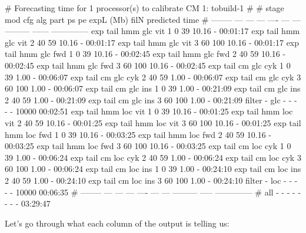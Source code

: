 
\begin{sreoutput}
# Forecasting time for 1 processor(s) to calibrate CM 1: tobuild-1
#
# stage     mod  cfg  alg  part  ps  pe expL (Mb)   filN predicted time
# --------  ---  ---  ---  ---- --- --- --------- ------ --------------
  exp tail  hmm  glc  vit     1   0  39     10.16      -       00:01:17
  exp tail  hmm  glc  vit     2  40  59     10.16      -       00:01:17
  exp tail  hmm  glc  vit     3  60 100     10.16      -       00:01:17
  exp tail  hmm  glc  fwd     1   0  39     10.16      -       00:02:45
  exp tail  hmm  glc  fwd     2  40  59     10.16      -       00:02:45
  exp tail  hmm  glc  fwd     3  60 100     10.16      -       00:02:45
  exp tail   cm  glc  cyk     1   0  39      1.00      -       00:06:07
  exp tail   cm  glc  cyk     2  40  59      1.00      -       00:06:07
  exp tail   cm  glc  cyk     3  60 100      1.00      -       00:06:07
  exp tail   cm  glc  ins     1   0  39      1.00      -       00:21:09
  exp tail   cm  glc  ins     2  40  59      1.00      -       00:21:09
  exp tail   cm  glc  ins     3  60 100      1.00      -       00:21:09
  filter      -  glc    -     -   -   -         -  10000       00:02:51
  exp tail  hmm  loc  vit     1   0  39     10.16      -       00:01:25
  exp tail  hmm  loc  vit     2  40  59     10.16      -       00:01:25
  exp tail  hmm  loc  vit     3  60 100     10.16      -       00:01:25
  exp tail  hmm  loc  fwd     1   0  39     10.16      -       00:03:25
  exp tail  hmm  loc  fwd     2  40  59     10.16      -       00:03:25
  exp tail  hmm  loc  fwd     3  60 100     10.16      -       00:03:25
  exp tail   cm  loc  cyk     1   0  39      1.00      -       00:06:24
  exp tail   cm  loc  cyk     2  40  59      1.00      -       00:06:24
  exp tail   cm  loc  cyk     3  60 100      1.00      -       00:06:24
  exp tail   cm  loc  ins     1   0  39      1.00      -       00:24:10
  exp tail   cm  loc  ins     2  40  59      1.00      -       00:24:10
  exp tail   cm  loc  ins     3  60 100      1.00      -       00:24:10
  filter      -  loc    -     -   -   -         -  10000       00:06:35
# --------  ---  ---  ---  ---- --- --- ---------  ----- --------------
# all         -    -    -     -   -   -         -      -       03:29:47
\end{sreoutput}

Let's go through what each column of the output is telling us:

